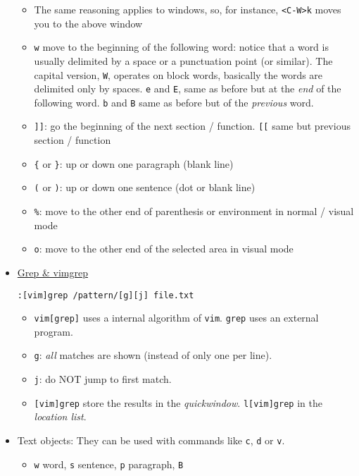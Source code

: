 \documentclass[a4paper,12pt,%
              final%
              ]{article}
\begin{document}
\begin{itemize}
\begin{itemize}
      \item The same reasoning applies to windows, so, for instance, \verb|<C-W>k|
        moves you to the above window
      \item \texttt{w} move to the beginning of the following word: notice that a
        word is usually delimited by a space or a punctuation point (or similar). The
        capital version, \texttt{W}, operates on block words, basically the words are
        delimited only by spaces. \texttt{e} and \texttt{E}, same as before but at
        the \emph{end} of the following word. \texttt{b} and \texttt{B} same as
        before but of the \emph{previous} word.
      \item \texttt{]]}: go the beginning of the next section / function. \texttt{[[}
        same but previous section / function
      \item \verb|{| or \verb|}|: up or down one paragraph (blank line)
      \item \verb|(| or \verb|)|: up or down one sentence (dot or blank line)
      \item \verb|%|: move to the other end of parenthesis or environment in normal / visual mode
      \item \verb|o|: move to the other end of the selected area in visual mode
    \end{itemize}
  \item \href{https://vim.fandom.com/wiki/Find_in_files_within_Vim}{Grep \& vimgrep}
\begin{verbatim}
:[vim]grep /pattern/[g][j] file.txt
\end{verbatim}
    \begin{itemize}
      \item \texttt{vim[grep]} uses a internal algorithm of \texttt{vim}.
        \texttt{grep} uses an external program.
      \item \texttt{g}: \emph{all} matches are shown (instead of only one per line).
      \item \texttt{j}: do NOT jump to first match.
      \item \texttt{[vim]grep} store the results in the \emph{quickwindow}.
        \texttt{l[vim]grep} in the \emph{location list}.
    \end{itemize}
  \item Text objects: They can be used with commands like \texttt{c}, \texttt{d} or
    \texttt{v}.
    \begin{itemize}
      \item \texttt{w} word, \texttt{s} sentence, \texttt{p} paragraph, \texttt{B}

\end{itemize}
\end{itemize}
\end{document}
